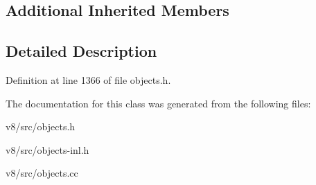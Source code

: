 \subsection*{Additional Inherited Members}


\subsection{Detailed Description}


Definition at line 1366 of file objects.\+h.



The documentation for this class was generated from the following files\+:\begin{DoxyCompactItemize}
\item 
v8/src/objects.\+h\item 
v8/src/objects-\/inl.\+h\item 
v8/src/objects.\+cc\end{DoxyCompactItemize}
